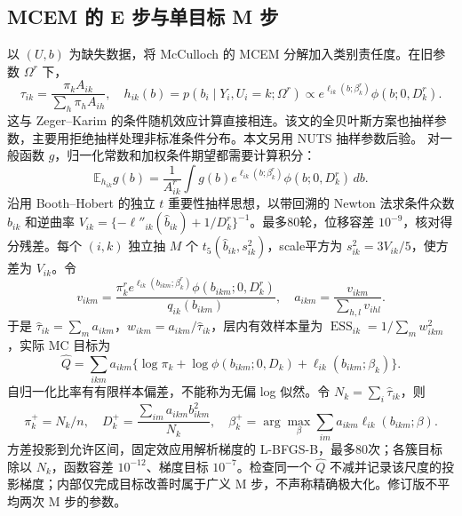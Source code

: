 \documentclass[UTF8,a4paper,11pt,fontset=fandol]{ctexart}
\newcommand{\E}{\mathbb E}\newcommand{\N}{\mathcal N}\newcommand{\KL}{\operatorname{KL}}
\begin{document}
\subsection{MCEM 的 E 步与单目标 M 步}
以 $(U,b)$ 为缺失数据，将 McCulloch 的 MCEM 分解加入类别责任度。在旧参数 $\Omega^r$ 下，
\[
\tau_{ik}=\frac{\pi_k A_{ik}}{\sum_h\pi_h A_{ih}},\quad
h_{ik}(b)=p(b_i\mid Y_i,U_i=k;\Omega^r)\propto e^{\ell_{ik}(b;\beta_k^r)}\phi(b;0,D_k^r).
\]
这与 Zeger--Karim 的条件随机效应计算直接相连。该文的全贝叶斯方案也抽样参数，主要用拒绝抽样处理非标准条件分布。本文另用 NUTS 抽样参数后验。
对一般函数 $g$，归一化常数和加权条件期望都需要计算积分：
\[
\E_{h_{ik}}g(b)=\frac{1}{A_{ik}^r}\int g(b)e^{\ell_{ik}(b;\beta_k^r)}\phi(b;0,D_k^r)\,db.
\]
沿用 Booth--Hobert 的独立 $t$ 重要性抽样思想，以带回溯的 Newton 法求条件众数 $\widehat b_{ik}$ 和逆曲率 $V_{ik}=\{-\ell''_{ik}(\widehat b_{ik})+1/D_k^r\}^{-1}$。最多80轮，位移容差 $10^{-9}$，核对得分残差。每个 $(i,k)$ 独立抽 $M$ 个 $t_5(\widehat b_{ik},s_{ik}^2)$，scale平方为 $s_{ik}^2=3V_{ik}/5$，使方差为 $V_{ik}$。令
\[
v_{ikm}=\frac{\pi_k^r e^{\ell_{ik}(b_{ikm};\beta_k^r)}\phi(b_{ikm};0,D_k^r)}{q_{ik}(b_{ikm})},\quad
a_{ikm}=\frac{v_{ikm}}{\sum_{h,l}v_{ihl}}.
\]
于是 $\widehat\tau_{ik}=\sum_m a_{ikm}$，$w_{ikm}=a_{ikm}/\widehat\tau_{ik}$，层内有效样本量为 $\operatorname{ESS}_{ik}=1/\sum_mw_{ikm}^2$，实际 MC 目标为
\[
\widehat Q=\sum_{ikm}a_{ikm}\{\log\pi_k+\log\phi(b_{ikm};0,D_k)+\ell_{ik}(b_{ikm};\beta_k)\}.
\]
自归一化比率有有限样本偏差，不能称为无偏 log 似然。令 $N_k=\sum_i\widehat\tau_{ik}$，则
\[
\pi_k^+=N_k/n,\quad D_k^+=\frac{\sum_{im}a_{ikm}b_{ikm}^2}{N_k},\quad
\beta_k^+=\arg\max_\beta\sum_{im}a_{ikm}\ell_{ik}(b_{ikm};\beta).
\]
方差投影到允许区间，固定效应用解析梯度的 L-BFGS-B，最多80次；各簇目标除以 $N_k$，函数容差 $10^{-12}$、梯度目标 $10^{-7}$。检查同一个 $\widehat Q$ 不减并记录该尺度的投影梯度；内部仅完成目标改善时属于广义 M 步，不声称精确极大化。修订版不平均两次 M 步的参数。
\end{document}
